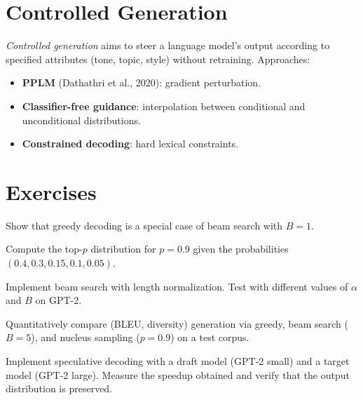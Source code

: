 \section{Controlled Generation}
\label{sec:gen:controlled}

\begin{definition}
\emph{Controlled generation} aims to steer a language model's output according
to specified attributes (tone, topic, style) without retraining. Approaches:
\begin{itemize}
    \item \textbf{PPLM} (Dathathri et al., 2020): gradient perturbation.
    \item \textbf{Classifier-free guidance}: interpolation between conditional
          and unconditional distributions.
    \item \textbf{Constrained decoding}: hard lexical constraints.
\end{itemize}
\end{definition}

\section{Exercises}
\label{sec:gen:exercises}

\begin{exercise}[$\star$]
Show that greedy decoding is a special case of beam search with $B = 1$.
\end{exercise}

\begin{exercise}[$\star$]
Compute the top-$p$ distribution for $p = 0.9$ given the probabilities
$(0.4, 0.3, 0.15, 0.1, 0.05)$.
\end{exercise}

\begin{exercise}[$\star\star$]
Implement beam search with length normalization. Test with different values of
$\alpha$ and $B$ on GPT-2.
\end{exercise}

\begin{exercise}[$\star\star$]
Quantitatively compare (BLEU, diversity) generation via greedy, beam search
($B=5$), and nucleus sampling ($p=0.9$) on a test corpus.
\end{exercise}

\begin{exercise}[$\star\star\star$]
Implement speculative decoding with a draft model (GPT-2 small) and a target
model (GPT-2 large). Measure the speedup obtained and verify that the output
distribution is preserved.
\end{exercise}
